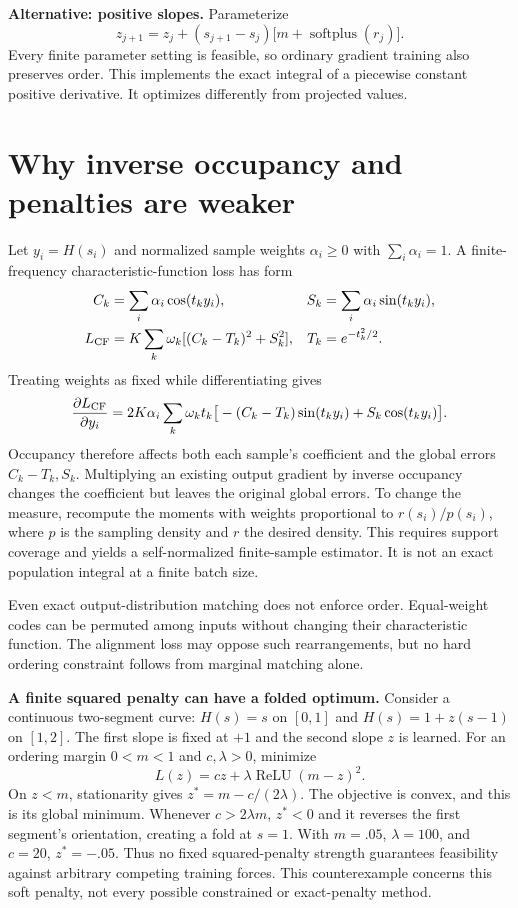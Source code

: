 \documentclass[11pt]{article}
\newcommand{\relu}{\operatorname{ReLU}}
\newcommand{\softplus}{\operatorname{softplus}}
\begin{document}
\textbf{Alternative: positive slopes.} Parameterize
\[
z_{j+1}=z_j+(s_{j+1}-s_j)\big[m+\softplus(r_j)\big].
\]
Every finite parameter setting is feasible, so ordinary gradient training
also preserves order. This implements the exact integral of a piecewise
constant positive derivative. It optimizes differently from projected values.

\newpage
\section{Why inverse occupancy and penalties are weaker}
Let $y_i=H(s_i)$ and normalized sample weights $\alpha_i\ge0$ with
$\sum_i\alpha_i=1$. A finite-frequency characteristic-function loss has form
\begin{align}
C_k&=\sum_i\alpha_i\cos(t_k y_i),& S_k&=\sum_i\alpha_i\sin(t_k y_i),\\
L_{\rm CF}&=K\sum_k\omega_k[(C_k-T_k)^2+S_k^2],&T_k&=e^{-t_k^2/2}.
\end{align}
Treating weights as fixed while differentiating gives
\begin{equation}
\frac{\partial L_{\rm CF}}{\partial y_i}
=2K\alpha_i\sum_k\omega_k t_k
\big[-(C_k-T_k)\sin(t_k y_i)+S_k\cos(t_k y_i)\big].
\end{equation}
Occupancy therefore affects both each sample's coefficient and the global
errors $C_k-T_k,S_k$. Multiplying an existing output gradient by inverse
occupancy changes the coefficient but leaves the original global errors.
To change the measure, recompute the moments with weights proportional to
$r(s_i)/p(s_i)$, where $p$ is the sampling density and $r$ the desired density.
This requires support coverage and yields a self-normalized finite-sample
estimator. It is not an exact population integral at a finite batch size.

Even exact output-distribution matching does not enforce order. Equal-weight
codes can be permuted among inputs without changing their characteristic
function. The alignment loss may oppose such rearrangements, but no hard
ordering constraint follows from marginal matching alone.

\textbf{A finite squared penalty can have a folded optimum.}
Consider a continuous two-segment curve: $H(s)=s$ on $[0,1]$ and
$H(s)=1+z(s-1)$ on $[1,2]$. The first slope is fixed at $+1$ and the
second slope $z$ is learned. For an ordering margin $0<m<1$ and
$c,\lambda>0$, minimize
\begin{equation}
 L(z)=cz+\lambda\relu(m-z)^2.
\end{equation}
On $z<m$, stationarity gives $z^*=m-c/(2\lambda)$. The objective is convex,
and this is its global minimum. Whenever $c>2\lambda m$, $z^*<0$ and it
reverses the first segment's orientation, creating a fold at $s=1$.
With $m=.05$, $\lambda=100$, and $c=20$,
$z^*=-.05$. Thus no fixed squared-penalty strength guarantees feasibility
against arbitrary competing training forces. This counterexample concerns
this soft penalty, not every possible constrained or exact-penalty method.
\end{document}
